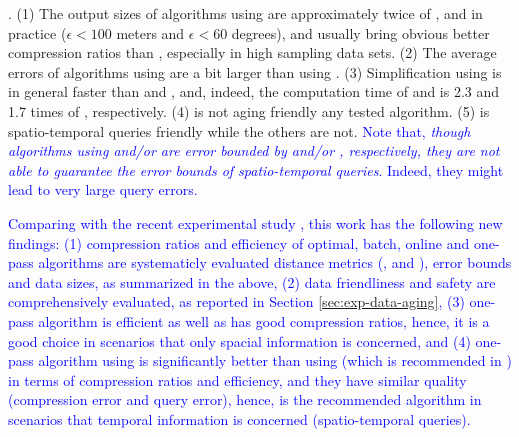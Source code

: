 {.
(1) The output sizes of algorithms using \sed are approximately twice of \ped, and in practice (\eg $\epsilon <100$ meters and $\epsilon < 60$ degrees), \ped and \sed usually bring obvious better compression ratios than \dad, especially in high sampling data sets.
%
(2) The average errors of algorithms using \sed are a bit larger than using \ped.
%
(3) Simplification using \dad is in general faster than \ped and \sed, and, indeed, the computation time of \ped and \sed is 2.3 and 1.7 times of \dad, respectively.
%
{(4) \dad is not aging friendly \wrt any tested algorithm.}
%
{(5) \sed is spatio-temporal queries friendly while the others are not. }
\textcolor{blue}{Note that, \emph{though algorithms using \ped and/or \dad are error bounded by \ped and/or \dad, respectively, they are not able to guarantee the error bounds of spatio-temporal queries}. Indeed, they might lead to very large query errors.}



\textcolor{blue}{Comparing with the recent experimental study \cite{Zhang:Evaluation}, this work has the following new findings: (1) compression ratios and efficiency of optimal, batch, online and one-pass algorithms are systematicly evaluated \wrt distance metrics (\ped, \sed and \dad), error bounds and data sizes, as summarized in the above, (2) data friendliness and safety are comprehensively evaluated, as reported in Section \ref{sec:exp-data-aging}, (3) one-pass algorithm \siped is efficient as well as has good compression ratios, hence, it is a good choice in scenarios that only spacial information is concerned, and (4) one-pass algorithm \cised using \sed is significantly better than \dagots using \lissed (which is recommended in \cite{Zhang:Evaluation}) in terms of compression ratios and efficiency, and they have similar quality (compression error and query error), hence, \cised is the recommended algorithm in scenarios that temporal information is concerned (\eg spatio-temporal queries). }




}
